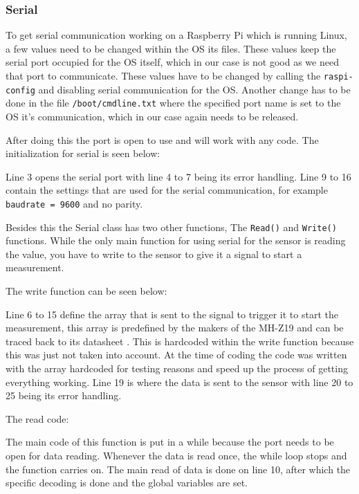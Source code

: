 \documentclass[a4paper,oneside]{book}
\begin{document}
\subsubsection{Serial}
To get serial communication working on a Raspberry Pi which is running Linux, a
few values need to be changed within the OS its files. These values keep the
serial port occupied for the OS itself, which in our case is not good as we
need that port to communicate. These values have to be changed by calling the
\lstinline|raspi-config| and disabling serial communication for the OS. Another
change has to be done in the file \lstinline|/boot/cmdline.txt| where the
specified port name is set to the OS it's communication, which in our case
again needs to be released.

After doing this the port is open to use and will work with any code. The
initialization for serial is seen below:



Line 3 opens the serial port with line 4 to 7 being its error handling. Line 9
to 16 contain the settings that are used for the serial communication, for
example \lstinline|baudrate = 9600| and no parity.

Besides this the Serial class has two other functions, The \lstinline|Read()|
and \lstinline|Write()| functions. While the only main function for using
serial for the  sensor is reading the value, you have to write to the sensor
to give it a signal to start a measurement.

The write function can be seen below:



Line 6 to 15 define the array that is sent to the  signal to trigger it to
start the measurement, this array is predefined by the makers of the MH-Z19 and
can be traced back to its datasheet \cite{mh-z19}. This is hardcoded within the
write function because this was just not taken into account. At the time of
coding the code was written with the array hardcoded for testing reasons and
speed up the process of getting everything working. Line 19 is where the data
is sent to the sensor with line 20 to 25 being its error handling.

The read code:



The main code of this function is put in a while because the port needs to be
open for data reading. Whenever the data is read once, the while loop stops and
the function carries on. The main read of data is done on line 10, after which
the  specific decoding is done and the global variables are set.
\end{document}
